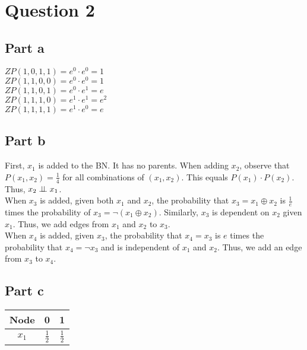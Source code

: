 \section{Question 2}
\subsection{Part a}
$ZP(1,0,1,1)=e^0\cdot e^0 = 1$\\
$ZP(1,1,0,0)=e^0\cdot e^0 = 1$\\
$ZP(1,1,0,1)=e^0\cdot e^1 = e$\\
$ZP(1,1,1,0)=e^1\cdot e^1 = e^2$\\
$ZP(1,1,1,1)=e^1\cdot e^0 = e$\\

\subsection{Part b}
First, $x_1$ is added to the BN. It has no parents. When adding $x_2$, observe that $P(x_1, x_2)=\frac{1}{4}$ for all combinations of $(x_1, x_2)$. This equals $P(x_1)\cdot P(x_2)$. Thus, $x_2\perp\mkern-9.5mu\perp x_1$.\\
When $x_3$ is added, given both $x_1$ and $x_2$, the probability that $x_3=x_1\oplus x_2$ is $\frac{1}{e}$ times the probability of $x_3=\neg(x_1\oplus x_2)$. Similarly, $x_3$ is dependent on $x_2$ given $x_1$. Thus, we add edges from $x_1$ and $x_2$ to $x_3$.\\
When $x_4$ is added, given $x_3$, the probability that $x_4=x_3$ is $e$ times the probability that $x_4=\neg x_3$ and is independent of $x_1$ and $x_2$. Thus, we add an edge from $x_3$ to $x_4$.\\

\subsection{Part c}
\begin{table}[h!]
    \centering
    \begin{tabular}{|c|c|c|}
    \hline
    \textbf{Node} & \textbf{0} & \textbf{1} \\ \hline
    $x_1$         & $\frac{1}{2}$ & $\frac{1}{2}$ \\ \hline
    \end{tabular}
\end{table}
    
